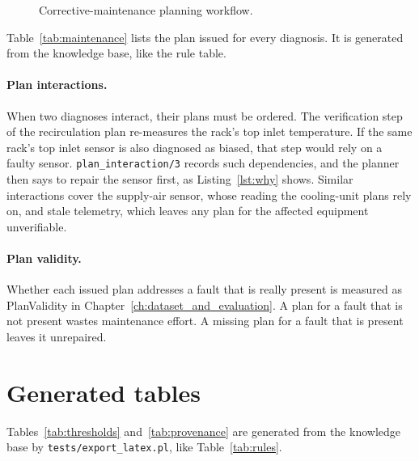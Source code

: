 \begin{figure}[htbp]
  \centering
  
  \caption{Corrective-maintenance planning workflow.}
  \label{fig:maintenance}
\end{figure}

Table~\ref{tab:maintenance} lists the plan issued for every diagnosis. It is generated from the knowledge base, like the rule table.



\paragraph{Plan interactions.} When two diagnoses interact, their plans must be ordered. The verification step of the recirculation plan re-measures the rack's top inlet temperature. If the same rack's top inlet sensor is also diagnosed as biased, that step would rely on a faulty sensor. \texttt{plan\_interaction/3} records such dependencies, and the planner then says to repair the sensor first, as Listing~\ref{lst:why} shows. Similar interactions cover the supply-air sensor, whose reading the cooling-unit plans rely on, and stale telemetry, which leaves any plan for the affected equipment unverifiable.

\paragraph{Plan validity.} Whether each issued plan addresses a fault that is really present is measured as PlanValidity in Chapter~\ref{ch:dataset_and_evaluation}. A plan for a fault that is not present wastes maintenance effort. A missing plan for a fault that is present leaves it unrepaired.

\section*{Generated tables}

Tables~\ref{tab:thresholds} and~\ref{tab:provenance} are generated from the knowledge base by \texttt{tests/export\_latex.pl}, like Table~\ref{tab:rules}.



